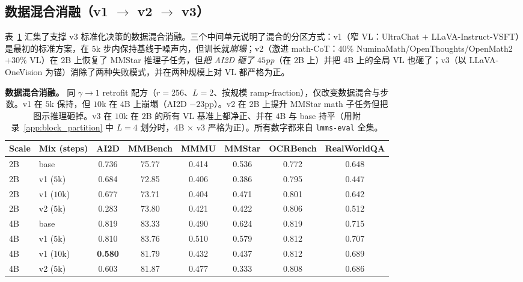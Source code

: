 \documentclass{article}
\begin{document}
\subsection{\texorpdfstring{数据混合消融（v1 $\to$ v2 $\to$ v3）}{Data-mix ablation (v1 to v2 to v3)}}
\label{app:data_mix}

表~\ref{tab:data_mix_ablation} 汇集了支撑 v3 标准化决策的数据混合消融。三个中间单元说明了混合的分区方式：v1（窄 VL：UltraChat $+$ LLaVA-Instruct-VSFT）是最初的标准方案，在 $5$k 步内保持基线于噪声内，但训长就\emph{崩塌}；v2（激进 math-CoT：$40\%$ NuminaMath/OpenThoughts/OpenMath2 $+ 30\%$ VL）在 2B 上恢复了 MMStar 推理子任务，但\emph{把 AI2D 砸了 $45$pp}（在 2B 上）并把 4B 上的全局 VL 也砸了；v3（以 LLaVA-OneVision 为锚）消除了两种失败模式，并在两种规模上对 VL 都严格为正。

\begin{table}[h]
\caption{\textbf{数据混合消融。} 同 $\gamma{\to}1$ retrofit 配方（$r{=}256$、$L{=}2$、按规模 ramp-fraction），仅改变数据混合与步数。v1 在 $5$k 保持，但 $10$k 在 $4$B 上崩塌（AI2D $-23$pp）。v2 在 2B 上提升 MMStar math 子任务但把图示推理砸掉。v3 在 $10$k 在 $2$B 的所有 VL 基准上都净正、并在 $4$B 与 base 持平（用附录~\ref{app:block_partition} 中 $L{=}4$ 划分时，$4$B $\times$ v3 严格为正）。所有数字都来自 \texttt{lmms-eval} 全集。}
\label{tab:data_mix_ablation}
\centering\small
\setlength{\tabcolsep}{4pt}
\begin{tabular}{llcccccc}
\toprule
Scale & Mix (steps) & AI2D & MMBench & MMMU & MMStar & OCRBench & RealWorldQA \\
\midrule
2B & base                  & 0.736 & 75.77 & 0.414 & 0.536 & 0.772 & 0.648 \\
2B & v1 ($5$k)             & 0.684 & 72.85 & 0.406 & 0.386 & 0.795 & 0.447 \\
2B & v1 ($10$k)            & 0.677 & 73.71 & 0.404 & 0.471 & 0.801 & 0.642 \\
2B & v2 ($5$k)             & 0.283 & 73.80 & 0.421 & 0.422 & 0.806 & 0.512 \\
\midrule
4B & base                  & 0.819 & 83.33 & 0.490 & 0.624 & 0.819 & 0.715 \\
4B & v1 ($5$k)             & 0.810 & 83.76 & 0.510 & 0.579 & 0.812 & 0.707 \\
4B & v1 ($10$k)            & \textbf{0.580} & 81.79 & 0.432 & 0.437 & 0.812 & 0.689 \\
4B & v2 ($5$k)             & 0.603 & 81.87 & 0.477 & 0.333 & 0.808 & 0.686 \\
\bottomrule
\end{tabular}
\end{table}
\end{document}

